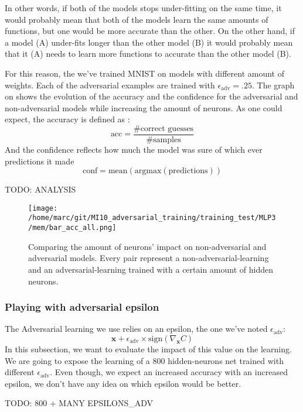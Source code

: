 			In other words, if both of the models stops under-fitting on the same time, it would probably mean that both of the models learn the same amounts of functions, but one would be more accurate than the other. On the other hand, if a model (A) under-fits longer than the other model (B) it would probably mean that it (A) needs to learn more functions to accurate than the other model (B).

			For this reason, the we've trained MNIST on models with different amount of weights. Each of the adversarial examples are trained with $\epsilon_{\text{adv}} = .25$. The graph on  shows the evolution of the accuracy and the confidence for the adversarial and non-adversarial models while increasing the amount of neurons. As one could expect, the accuracy is defined as :
			$$\text{acc} = \frac{\text{\#correct guesses}}{\text{\#samples}}$$ 
			And the confidence reflects how much the model was sure of which ever predictions it made 
			$$\text{conf} =  \text{mean}( \text{argmax} (\text{predictions}))$$

			TODO: ANALYSIS
			\begin{figure}
				\centering
				\texttt{[image: /home/marc/git/MI10\_adversarial\_training/training\_test/MLP3/mem/bar\_acc\_all.png]}
				\caption{Comparing the amount of neurons' impact on non-adversarial and adversarial models. Every pair represent a non-adversarial-learning and an adversarial-learning trained with a certain amount of hidden neurons.}
				\label{fig:mnist_neurons}
			\end{figure}



		\subsubsection{Playing with adversarial epsilon}
		\label{ssub:playing_with_adversarial_epsilon}
			The Adversarial learning we use relies on an epsilon, the one we've noted $\epsilon_{\text{adv}}$:
			$$ \boldsymbol{x} + \epsilon_{\text{adv}} \times \text{sign}(\nabla_{\boldsymbol{x}} C) $$
			In this subsection, we want to evaluate the impact of this value on the learning. We are going to expose the learning of a 800 hidden-neurons net trained with different $\epsilon_{\text{adv}}$. Even though, we expect an increased accuracy with an increased epsilon, we don't have any idea on which epsilon would be better. 

			TODO: 800 + MANY EPSILONS_ADV

